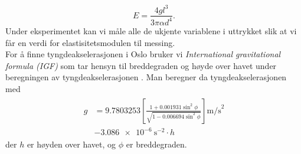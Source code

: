 \documentclass[%
 reprint,
nofootinbib,
aps,
]{revtex4-1}
\begin{document}
\begin{equation}
  E = \frac{4gl^3}{3\pi \alpha d^4}. \label{young3}
\end{equation}
Under eksperimentet kan vi måle alle de ukjente variablene i uttrykket slik at vi får en verdi for elastisitetsmodulen til messing.\\
For å finne tyngdeakselerasjonen i Oslo bruker vi \textit{International gravitational formula (IGF)} som tar hensyn til breddegraden og høyde over havet under beregningen av tyngdeakselerasjonen \cite{gravity}. Man beregner da tyngdeakselerasjonen med
\begin{align}
\begin{split}
  g &= 9.7803253\left[\frac{1+0.001931\sin^2{\phi}}{\sqrt{1-0.006694\sin^2{\phi}}}\right]\text{m/s}^2\\
      &- \SI{3.086e-6}{\second^{-2}}\cdot h \label{calc_g}
\end{split}
\end{align}
der $h$ er høyden over havet, og $\phi$ er breddegraden.
\end{document}
